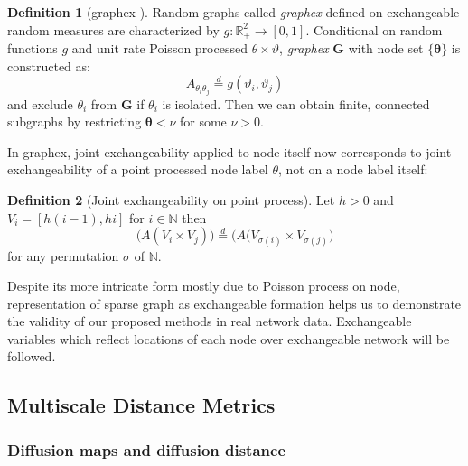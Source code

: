 \documentclass[12pt]{article}
\theoremstyle{definition}
\newtheorem{definition}{Definition}[section]
\begin{document}
\begin{definition}[graphex \cite{kallenberg1990exchangeable}]
\label{graphex}
Random graphs called \textit{graphex} defined on exchangeable random measures are characterized by $g : \mathbb{R}^{2}_{+} \rightarrow [0,1]$. Conditional on random functions $g$ and unit rate Poisson processed $\theta \times \vartheta$,  \textit{graphex} $\mathbf{G}$ with node set $\{ \mathbf{\theta} \}$ is constructed as:
\begin{equation}
A_{\theta_{i} \theta_{j}} \stackrel{d}{=} g(\vartheta_{i}, \vartheta_{j})
\end{equation}
and exclude $\theta_{i}$ from $\mathbf{G}$ if $\theta_{i}$ is isolated. Then we can obtain finite, connected subgraphs by restricting $\mathbf{\theta}  < \nu$ for some $\nu > 0$.		
\end{definition}
In graphex, joint exchangeability applied to node itself now corresponds to joint exchangeability of a point processed node label $\theta$, not on a node label itself:
\begin{definition}[Joint exchangeability on point process]
	\label{point}
	Let $h > 0$ and  $V_{i} = [h(i-1), hi ]$ for $i \in \mathbb{N}$ then
	\begin{equation}
	\big( A( V_{i} \times V_{j}  )   \big)  \stackrel{d}{=} \big( A( V_{\sigma(i)} \times V_{\sigma(j)}     \big)
	\end{equation}	
	for any permutation $\sigma$ of $\mathbb{N}$.		
\end{definition}
Despite its more intricate form mostly due to Poisson process on node, representation of sparse graph as exchangeable formation helps us to demonstrate the validity of our proposed methods in real network data. Exchangeable variables which reflect locations of each node over exchangeable network will be followed.

\subsection{Multiscale Distance Metrics}	

\subsubsection{Diffusion maps and diffusion distance}	
\end{document}
